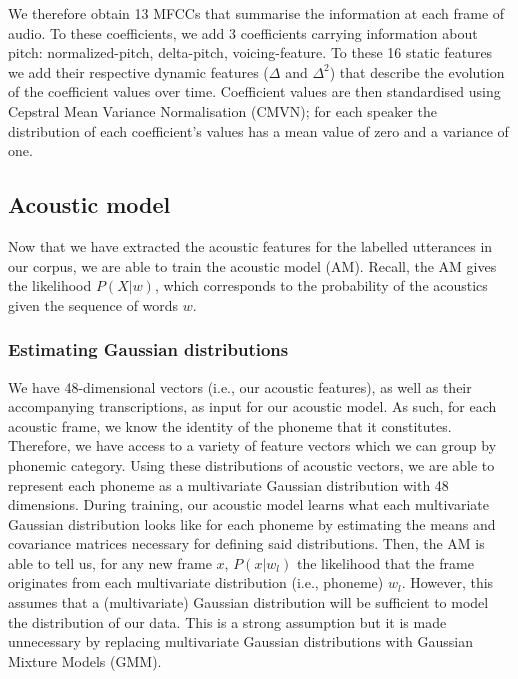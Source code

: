 We therefore obtain 13 MFCCs that summarise the information at each frame of audio. To these coefficients, we add 3 coefficients carrying information about pitch: normalized-pitch, delta-pitch, voicing-feature.
To these 16 static features we add their respective dynamic features ($\Delta$ and $\Delta^2$) that describe the evolution of the coefficient values over time. 
Coefficient values are then standardised using Cepstral Mean Variance Normalisation (CMVN); for each speaker the distribution of each coefficient's values has a mean value of zero and a variance of one. 

\subsection{Acoustic model}

Now that we have extracted the acoustic features for the labelled utterances in our corpus, we are able to train the acoustic model (AM). Recall, the AM gives the likelihood $P(X|w)$, which corresponds to the probability of the acoustics given the sequence of words $w$.

\subsubsection{Estimating Gaussian distributions}
We have 48-dimensional vectors (i.e., our acoustic features), as well as their accompanying transcriptions, as input for our acoustic model. As such, for each acoustic frame, we know the identity of the phoneme that it constitutes. Therefore, we have access to a variety of feature vectors which we can group by phonemic category. Using these distributions of acoustic vectors, we are able to represent each phoneme as a multivariate Gaussian distribution with 48 dimensions. During training, our acoustic model learns what each multivariate Gaussian distribution looks like for each phoneme by estimating the means and covariance matrices necessary for defining said distributions.
Then, the AM is able to tell us, for any new frame $x$, $P(x|w_{l})$ the likelihood that the frame originates from each multivariate distribution (i.e., phoneme) $w_{l}$. However, this assumes that a (multivariate) Gaussian distribution will be sufficient to model the distribution of our data. This is a strong assumption but it is made unnecessary by replacing multivariate Gaussian distributions with Gaussian Mixture Models (GMM).

